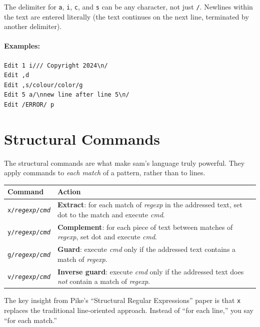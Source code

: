 The delimiter for \texttt{a}, \texttt{i}, \texttt{c}, and \texttt{s}
can be any character, not just \texttt{/}.  Newlines within the text are
entered literally (the text continues on the next line, terminated by
another delimiter).

\paragraph{Examples:}

\begin{Verbatim}[frame=single]
Edit 1 i/// Copyright 2024\n/
Edit ,d
Edit ,s/colour/color/g
Edit 5 a/\nnew line after line 5\n/
Edit /ERROR/ p
\end{Verbatim}

\section{Structural Commands}
\label{sec:structural}


The structural commands are what make sam's language truly powerful.
They apply commands to \emph{each match} of a pattern, rather than to
lines.

\begin{longtable}{@{}lp{3.5in}@{}}
\toprule
Command & Action \\
\midrule
\endhead
\texttt{x/\textit{regexp}/\textit{cmd}} & \textbf{Extract}: for each
  match of \textit{regexp} in the addressed text, set dot to the match
  and execute \textit{cmd}. \\
\texttt{y/\textit{regexp}/\textit{cmd}} & \textbf{Complement}: for
  each piece of text between matches of \textit{regexp}, set dot and
  execute \textit{cmd}. \\
\texttt{g/\textit{regexp}/\textit{cmd}} & \textbf{Guard}: execute
  \textit{cmd} only if the addressed text contains a match of
  \textit{regexp}. \\
\texttt{v/\textit{regexp}/\textit{cmd}} & \textbf{Inverse guard}:
  execute \textit{cmd} only if the addressed text does \emph{not}
  contain a match of \textit{regexp}. \\
\bottomrule
\end{longtable}

The key insight from Pike's ``Structural Regular Expressions'' paper is
that \texttt{x} replaces the traditional line-oriented approach.
Instead of ``for each line,'' you say ``for each match.''

